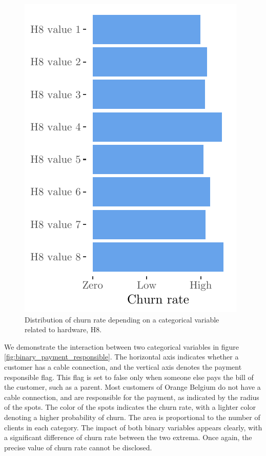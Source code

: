 \begin{figure}
\begin{minipage}{.45\textwidth}
    	\includegraphics{figures/categorical.pdf}
    	\caption{Distribution of churn rate depending on a categorical variable
    	related to hardware, H8.}
    	\label{fig:categorical}
    \end{minipage}
\end{figure}


We demonstrate the interaction between two categorical variables in figure
\ref{fig:binary_payment_responsible}. The horizontal axis indicates whether a
customer has a cable connection, and the vertical axis denotes the payment
responsible flag. This flag is set to false only when someone else pays the bill
of the customer, such as a parent. Most customers of Orange Belgium do not have
a cable connection, and are responsible for the payment, as indicated by the
radius of the spots. The color of the spots indicates the churn rate, with a
lighter color denoting a higher probability of churn. The area is proportional
to the number of clients in each category. The impact of both binary variables
appears clearly, with a significant difference of churn rate between the two
extrema. Once again, the precise value of churn rate cannot be disclosed.


